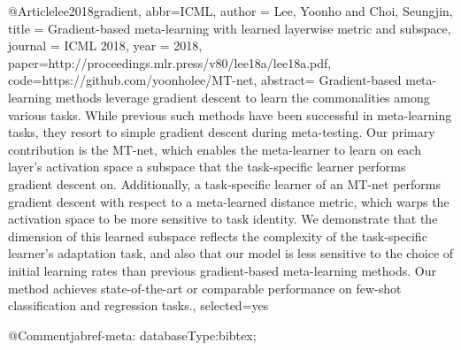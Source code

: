 @Article{lee2018gradient,
  abbr={ICML},
  author  = {Lee, Yoonho and Choi, Seungjin},
  title   = {Gradient-based meta-learning with learned layerwise metric and subspace},
  journal = {ICML 2018},
  year    = {2018},
  paper={http://proceedings.mlr.press/v80/lee18a/lee18a.pdf},
  code={https://github.com/yoonholee/MT-net},
  abstract={
    Gradient-based meta-learning methods leverage gradient descent to learn the commonalities among various tasks. 
    While previous such methods have been successful in meta-learning tasks, they resort to simple gradient descent during meta-testing. 
    Our primary contribution is the MT-net, which enables the meta-learner to learn on each layer's activation space a subspace that the task-specific learner performs gradient descent on. 
    Additionally, a task-specific learner of an MT-net performs gradient descent with respect to a meta-learned distance metric, which warps the activation space to be more sensitive to task identity. 
    We demonstrate that the dimension of this learned subspace reflects the complexity of the task-specific learner's adaptation task, and also that our model is less sensitive to the choice of initial learning rates than previous gradient-based meta-learning methods. 
    Our method achieves state-of-the-art or comparable performance on few-shot classification and regression tasks.},
  selected={yes}
}

@Comment{jabref-meta: databaseType:bibtex;}
